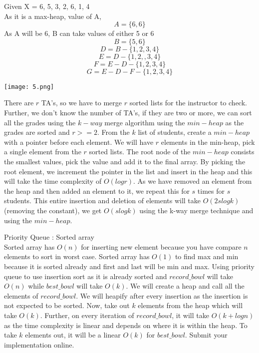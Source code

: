\documentclass[12pt,twoside]{article}
\begin{document}
\begin{problems}
\begin{problemparts}
\begin{itemize}
\end{itemize}

\problempart %
Given X = {6, 5, 3, 2, 6, 1, 4} \\
As it is a max-heap, value of A,
\[A = \{6, 6\}\]
As A will be 6, B can take values of either 5 or 6 
\[B = \{5, 6\} \]
\[D = B - \{1, 2, 3, 4\}\]
\[E = D - \{1, 2, ,3, 4\}\]
\[F = E - D - \{1, 2, 3, 4\}\]
\[G = E - D - F - \{1, 2, 3, 4\}\]
\begin{center}
  \texttt{[image: 5.png]}
\end{center}
\end{problemparts}
\newpage
\problem  %

\begin{problemparts}
\problempart %
There are $r$ TA's, so we have to merge $r$ sorted lists for the instructor to check. Further, we don't know the number of TA's, if they are two or more, we can sort all the grades using the $k-way$ merge algorithm using the $min-heap$ as the grades are sorted and $r>=2$. From the $k$ list of students, create a $min-heap$ with a pointer before each element. We will have $r$ elements in the min-heap, pick a single element from the $r$ sorted lists. The root node of the $min-heap$ consists the smallest values, pick the value and add it to the final array. By picking the root element, we increment the pointer in the list and insert in the heap and this will take the time complexity of $O(log r)$. As we have removed an element from the heap and then added an element to it, we repeat this for $s$ times for $s $ students. This entire insertion and deletion of elements will take $O(2s logk)$ (removing the constant), we get $O(slogk)$ using the k-way merge technique and using the $min-heap$. 

\end{problemparts}

\newpage
\problem  %

\begin{problemparts}
\problempart %
Priority Queue : Sorted array \\
Sorted array has $O(n)$ for inserting new element because you have compare $n$ elements to sort in worst case. Sorted array has $O(1)$ to find max and min because it is sorted already and first and last will be min and max. 
\problempart %
Using priority queue to use insertion sort as it is already sorted and $record\_bowl$ will take $O(n)$ while $best\_bowl$ will take $O(k)$. We will create a heap and call all the elements of $record\_bowl$. We will heapify after every insertion as the insertion is not expected to be sorted. Now, take out $k$ elements from the heap which will take $O(k)$. Further, on every iteration of $record\_bowl$, it will take $O(k + log n)$ as the time complexity is linear and depends on where it is within the heap. To take $k$ elements out, it will be a linear $O(k)$ for $best\_bowl$.
\problempart Submit your implementation online. 
\end{problemparts}

\end{problems}
\end{document}
